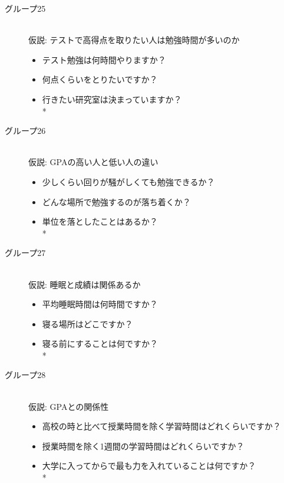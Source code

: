 \begin{description}
 \item[グループ25]\mbox{}\\
 仮説: テストで高得点を取りたい人は勉強時間が多いのか
	    \begin{itemize}
   	\item テスト勉強は何時間やりますか？
   	\item 何点くらいをとりたいですか？
   	\item 行きたい研究室は決まっていますか？   \vspace{0.1in} \\*
	\end{itemize}

 \item[グループ26]\mbox{}\\
 仮説: GPAの高い人と低い人の違い
	    \begin{itemize}
   	\item 少しくらい回りが騒がしくても勉強できるか？
   	\item どんな場所で勉強するのが落ち着くか？
   	\item 単位を落としたことはあるか？   \vspace{0.1in} \\*
	\end{itemize}

 \item[グループ27]\mbox{}\\
 仮説: 睡眠と成績は関係あるか
	    \begin{itemize}
   	\item 平均睡眠時間は何時間ですか？
   	\item 寝る場所はどこですか？
   	\item 寝る前にすることは何ですか？   \vspace{0.1in} \\*
	\end{itemize}

 \item[グループ28]\mbox{}\\
 仮説: GPAとの関係性
	    \begin{itemize}
   	\item 高校の時と比べて授業時間を除く学習時間はどれくらいですか？
   	\item 授業時間を除く1週間の学習時間はどれくらいですか？
   	\item 大学に入ってからで最も力を入れていることは何ですか？   \vspace{0.1in} \\*
	\end{itemize}


\end{description}
